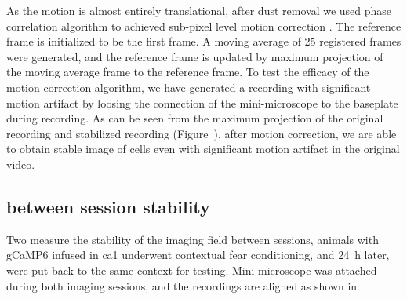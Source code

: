 As the motion is almost entirely translational, after dust removal we used phase correlation algorithm to achieved sub-pixel level motion correction \citep{guizar08}. The reference frame is initialized to be the first frame. A moving average of 25 registered frames were generated, and the reference frame is updated by maximum projection of the moving average frame to the reference frame. To test the efficacy of the motion correction algorithm, we have generated a recording with significant motion artifact by loosing the connection of the mini-microscope to the baseplate during recording. As can be seen from the maximum projection of the original recording and stabilized recording (Figure~), after motion correction, we are able to obtain stable image of cells even with significant motion artifact in the original video.
\begin{figure}[h]
    \begin{subfigure}[t]{.5\textwidth}
        \centering

        \caption{\label{motion.orig}}
    \end{subfigure}
    \begin{subfigure}[t]{.5\textwidth}
        \centering
        \caption{\label{motion.corrected}}
    \end{subfigure}
    \caption{\label{f.motion}}
\end{figure}


\subsection{between session stability}
Two measure the stability of the imaging field between sessions, animals with gCaMP6 infused in \gls{ca1} underwent contextual fear conditioning, and \SI{24}{\hour} later, were put back to the same context for testing. Mini-microscope was attached during both imaging sessions, and the recordings are aligned as shown in . 

